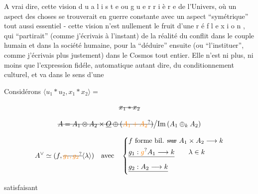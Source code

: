 A vrai dire, cette vision d u a l i s t e ou g u e r r i è r e de l'Univers, où un aspect des choses se trouverait en guerre constante avec un aspect ``symétrique'' tout aussi essentiel - cette vision n'est nullement le fruit d'une r é f l e x i o n , qui ``partirait'' (comme j'écrivais à l'instant) de la réalité du conflit dans le couple humain et dans la société humaine, pour la ``déduire'' ensuite (ou ``l'instituer'', comme j'écrivais plus justement) dans le Cosmos tout entier. Elle n'est ni plus, ni moins que l'expression fidéle, automatique autant dire, du conditionnement culturel, et va dans le sens d'une


Considérons $\langle u_1*u_2,x_1*x_2\rangle={}$

\[ \deleted{x_1*x_2} \]



\[ \deleted{A=A_1\otimes A_2\times\underline O\oplus(\unsure{A_1+A_2})}\big/\mathrm{Im}\,(A_1\oplus_{k}A_2) \]


\[
A^\vee\simeq(f,\deleted{\unsure{g_1,g_2}}\inserted{\lambda})\quad\text{avec}\quad
\left\{\begin{aligned}
& f\ \text{forme bil. }\deleted{\text{sur}}\ A_1\times A_2\longrightarrow k\\
&\deleted{g_1:\unsure{g}A_1\longrightarrow k}\qquad\lambda\in k\\
&\deleted{g_2:A_2\longrightarrow k}
\end{aligned}\right.
\]

satisfaisant 


